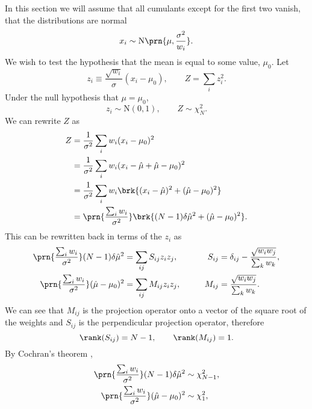 \documentclass[12pt]{article}
\newcommand{\mh}{\hat\mu}
\begin{document}
In this section we will assume that all cumulants except for the first two vanish, \ie that the distributions are normal
%
\begin{equation}\label{eq:scalednormal}
  x_i \sim \text{N}\prn{\mu,\frac{\sigma^2}{w_i}}.
\end{equation}
%
We wish to test the hypothesis that the mean is equal to some value, $\mu_0$. Let
%
\begin{equation}\label{eq:stdvars}
  z_i \equiv \frac{\sqrt{w_i}}{\sigma}(x_i-\mu_0),
  \qquad
  Z = \sum_i z_i^2.
\end{equation}
%
Under the null hypothesis that $\mu=\mu_0$,
%
\begin{equation}\label{eq:stddists}
  z_i \sim \text{N}(0,1),
  \qquad
  Z \sim \chi^2_N.
\end{equation}
%
We can rewrite $Z$ as
%
\begin{equation}\label{eq:cochranversion}
  \begin{aligned}
    Z &= \frac{1}{\sigma^2} \sum_i w_i (x_i - \mu_0)^2 \\
      &= \frac{1}{\sigma^2} \sum_i w_i (x_i - \mh + \mh - \mu_0)^2 \\
      &= \frac{1}{\sigma^2} \sum_i w_i \brk{(x_i - \mh)^2 + (\mh - \mu_0)^2} \\
      &= \prn{\frac{\sum_i w_i}{\sigma^2}}  \brk{(N-1)\delta\mh^2 + (\mh - \mu_0)^2}.
  \end{aligned}
\end{equation}
%
This can be rewritten back in terms of the $z_i$ as
%
\begin{equation}\label{eq:cochrancoeffs}
  \begin{aligned}
    \prn{\frac{\sum_i w_i}{\sigma^2}}  (N-1)\delta\mh^2 &= \sum_{ij} S_{ij} z_i z_j,
    &\qquad
     S_{ij} &= \delta_{ij} - \frac{\sqrt{w_i w_j}}{\sum_k w_k}, \\
    \prn{\frac{\sum_i w_i}{\sigma^2}}  (\mh - \mu_0)^2  &= \sum_{ij} M_{ij} z_i z_j,
    &\qquad
     M_{ij} &= \frac{\sqrt{w_i w_j}}{\sum_k w_k}.
  \end{aligned}
\end{equation}
%
We can see that $M_{ij}$ is the projection operator onto a vector of the square root of the weights and $S_{ij}$ is the perpendicular projection operator, therefore
%
\begin{equation}\label{eq:cochranrank}
  \rank(S_{ij}) = N-1, \qquad \rank(M_{ij}) = 1.
\end{equation}
%
By Cochran's theorem \cite{Cochran:1934},
%
\begin{equation}\label{eq:cochrandist}
  \begin{aligned}
    \prn{\frac{\sum_i w_i}{\sigma^2}}  (N-1)\delta\mh^2 &\sim \chi^2_{N-1}, \\
    \prn{\frac{\sum_i w_i}{\sigma^2}}  (\mh - \mu_0)^2  &\sim \chi^2_{1},
  \end{aligned}
\end{equation}
\end{document}

